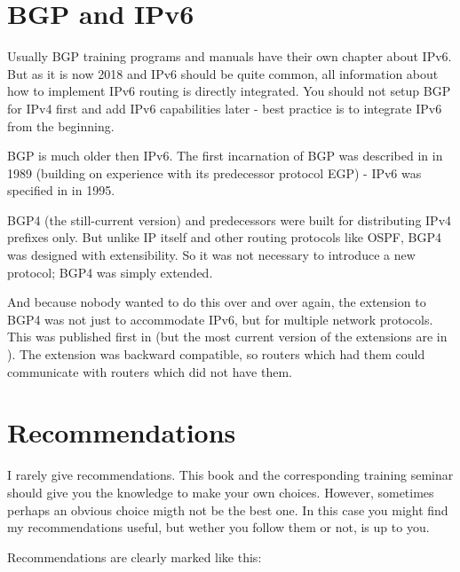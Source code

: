 \section{BGP and IPv6}
Usually BGP training programs and manuals have their own chapter about IPv6. But as it is now 2018 and IPv6 should be quite common, all information about how to implement IPv6 routing is directly integrated. You should not setup BGP for IPv4 first and add IPv6 capabilities later - best practice is to integrate IPv6 from the beginning.

BGP is much older then IPv6. The first incarnation of BGP was described in  in 1989 (building on experience with its predecessor protocol \gls{EGP}) - IPv6 was specified in  in 1995.

BGP4 (the still-current version) and predecessors were built for distributing IPv4 prefixes only. But unlike IP itself and other routing protocols like \gls{OSPF}, BGP4 was designed with extensibility. So it was not necessary to introduce a new protocol; BGP4 was simply extended.

And because nobody wanted to do this over and over again, the extension to BGP4 was not just to accommodate IPv6, but for multiple network protocols. This was published first in  (but the most current version of the extensions are in ). The extension was backward compatible, so routers which had them could communicate with routers which did not have them.

\section{Recommendations}
I rarely give recommendations. This book and the corresponding training seminar should give you the knowledge to make your own choices. However, sometimes perhaps an obvious choice migth not be the best one. In this case you might find my recommendations useful, but wether you follow them or not, is up to you.

Recommendations are clearly marked like this:

